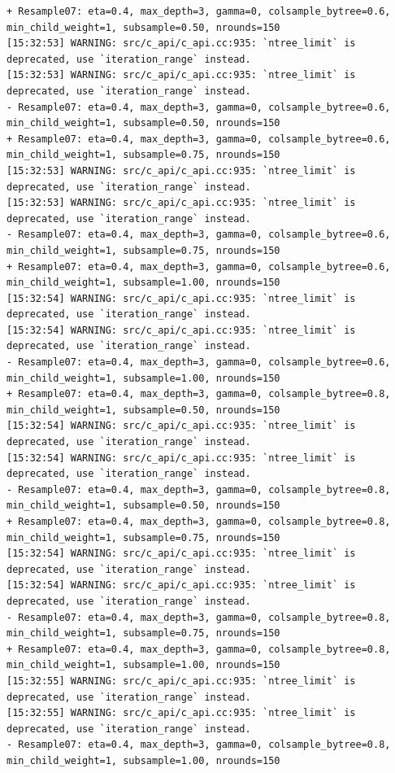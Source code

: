 \documentclass[
  letterpaper,
  DIV=11,
  numbers=noendperiod]{scrartcl}
\begin{document}
\begin{verbatim}
+ Resample07: eta=0.4, max_depth=3, gamma=0, colsample_bytree=0.6, min_child_weight=1, subsample=0.50, nrounds=150 
[15:32:53] WARNING: src/c_api/c_api.cc:935: `ntree_limit` is deprecated, use `iteration_range` instead.
[15:32:53] WARNING: src/c_api/c_api.cc:935: `ntree_limit` is deprecated, use `iteration_range` instead.
- Resample07: eta=0.4, max_depth=3, gamma=0, colsample_bytree=0.6, min_child_weight=1, subsample=0.50, nrounds=150 
+ Resample07: eta=0.4, max_depth=3, gamma=0, colsample_bytree=0.6, min_child_weight=1, subsample=0.75, nrounds=150 
[15:32:53] WARNING: src/c_api/c_api.cc:935: `ntree_limit` is deprecated, use `iteration_range` instead.
[15:32:53] WARNING: src/c_api/c_api.cc:935: `ntree_limit` is deprecated, use `iteration_range` instead.
- Resample07: eta=0.4, max_depth=3, gamma=0, colsample_bytree=0.6, min_child_weight=1, subsample=0.75, nrounds=150 
+ Resample07: eta=0.4, max_depth=3, gamma=0, colsample_bytree=0.6, min_child_weight=1, subsample=1.00, nrounds=150 
[15:32:54] WARNING: src/c_api/c_api.cc:935: `ntree_limit` is deprecated, use `iteration_range` instead.
[15:32:54] WARNING: src/c_api/c_api.cc:935: `ntree_limit` is deprecated, use `iteration_range` instead.
- Resample07: eta=0.4, max_depth=3, gamma=0, colsample_bytree=0.6, min_child_weight=1, subsample=1.00, nrounds=150 
+ Resample07: eta=0.4, max_depth=3, gamma=0, colsample_bytree=0.8, min_child_weight=1, subsample=0.50, nrounds=150 
[15:32:54] WARNING: src/c_api/c_api.cc:935: `ntree_limit` is deprecated, use `iteration_range` instead.
[15:32:54] WARNING: src/c_api/c_api.cc:935: `ntree_limit` is deprecated, use `iteration_range` instead.
- Resample07: eta=0.4, max_depth=3, gamma=0, colsample_bytree=0.8, min_child_weight=1, subsample=0.50, nrounds=150 
+ Resample07: eta=0.4, max_depth=3, gamma=0, colsample_bytree=0.8, min_child_weight=1, subsample=0.75, nrounds=150 
[15:32:54] WARNING: src/c_api/c_api.cc:935: `ntree_limit` is deprecated, use `iteration_range` instead.
[15:32:54] WARNING: src/c_api/c_api.cc:935: `ntree_limit` is deprecated, use `iteration_range` instead.
- Resample07: eta=0.4, max_depth=3, gamma=0, colsample_bytree=0.8, min_child_weight=1, subsample=0.75, nrounds=150 
+ Resample07: eta=0.4, max_depth=3, gamma=0, colsample_bytree=0.8, min_child_weight=1, subsample=1.00, nrounds=150 
[15:32:55] WARNING: src/c_api/c_api.cc:935: `ntree_limit` is deprecated, use `iteration_range` instead.
[15:32:55] WARNING: src/c_api/c_api.cc:935: `ntree_limit` is deprecated, use `iteration_range` instead.
- Resample07: eta=0.4, max_depth=3, gamma=0, colsample_bytree=0.8, min_child_weight=1, subsample=1.00, nrounds=150 

\end{verbatim}
\end{document}
